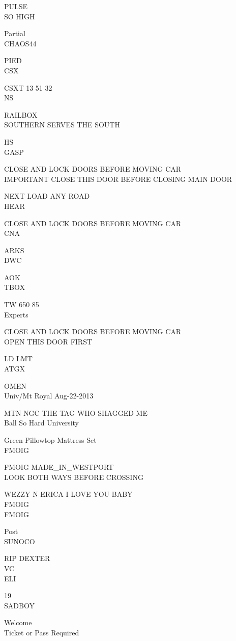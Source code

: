 \documentclass[10pt,letterpaper]{article}
\begin{document}
PULSE\\
SO HIGH

Partial\\
CHAOS44

PIED\\
CSX

CSXT 13 51 32\\
NS

RAILBOX\\
SOUTHERN SERVES THE SOUTH

HS\\
GASP

CLOSE AND LOCK DOORS BEFORE MOVING CAR\\
IMPORTANT CLOSE THIS DOOR BEFORE CLOSING MAIN DOOR

NEXT LOAD ANY ROAD\\
HEAR

CLOSE AND LOCK DOORS BEFORE MOVING CAR\\
CNA

ARKS\\
DWC

AOK\\
TBOX

TW 650 85\\
Experts

CLOSE AND LOCK DOORS BEFORE MOVING CAR\\
OPEN THIS DOOR FIRST

LD LMT\\
ATGX

OMEN\\
Univ/Mt Royal Aug{-}22{-}2013

MTN NGC THE TAG WHO SHAGGED ME\\
Ball So Hard University

Green Pillowtop Mattress Set\\
FMOIG

FMOIG MADE\_IN\_WESTPORT\\
LOOK BOTH WAYS BEFORE CROSSING

WEZZY N ERICA I LOVE YOU BABY\\
FMOIG\\
FMOIG

Post\\
SUNOCO

RIP DEXTER\\
VC\\
ELI

19\\
SADBOY

Welcome\\
Ticket or Pass Required
\end{document}
